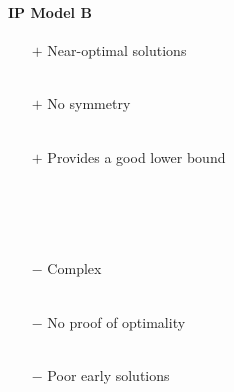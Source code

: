 \documentclass{beamer}
\newcommand{\AutoSectionTitle}{}
\begin{document}


\begin{frame}
  \frametitle{\AutoSectionTitle}
  \framesubtitle{IP Model B}

  \begin{itemize}
  \item[$+$] Near-optimal solutions \\~\\
  \item[$+$] No symmetry \\~\\
  \item[$+$] Provides a good lower bound \\~\\~\\~\\~\\

    \pause
    
  \item[$-$] Complex \\~\\
  \item[$-$] No proof of optimality \\~\\    
  \item[$-$] Poor early solutions
  \end{itemize}

\end{frame}




\begin{frame}
\end{frame}


\end{document}
